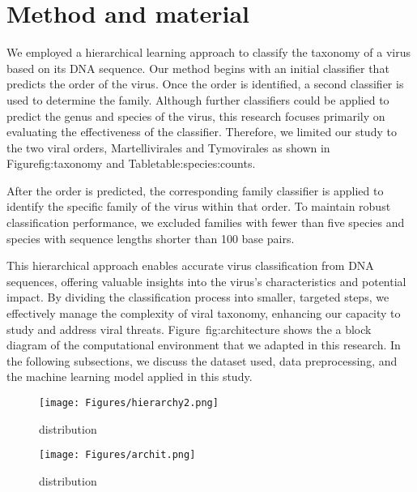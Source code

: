 

\section {Method and material}

We employed a hierarchical learning approach to classify the taxonomy of a virus based on its DNA sequence. Our method begins with an initial classifier that predicts the order of the virus. Once the order is identified, a second classifier is used to determine the family. Although further classifiers could be applied to predict the genus and species of the virus, this research focuses primarily on evaluating the effectiveness of the classifier. Therefore, we limited our study to the two viral orders, Martellivirales and Tymovirales as shown in Figure{fig:taxonomy} and Table{table:species:counts}.

After the order is predicted, the corresponding family classifier is applied to identify the specific family of the virus within that order. To maintain robust classification performance, we excluded families with fewer than five species and species with sequence lengths shorter than 100 base pairs.

This hierarchical approach enables accurate virus classification from DNA sequences, offering valuable insights into the virus’s characteristics and potential impact. By dividing the classification process into smaller, targeted steps, we effectively manage the complexity of viral taxonomy, enhancing our capacity to study and address viral threats. Figure~{fig:architecture} shows the a block diagram of the computational environment that we adapted in this research. In the following subsections, we discuss the dataset used, data preprocessing, and the machine learning model applied in this study.

\begin{figure}[t]
\begin{centering}
		\texttt{[image: Figures/hierarchy2.png]}
	\caption{distribution  }
\label{fig:taxonomy}
\end{centering}
\end{figure}


\begin{figure*}[t]
\begin{centering}
		\texttt{[image: Figures/archit.png]}
	\caption{distribution  }
\label{fig:architecture}
\end{centering}
\end{figure*}

